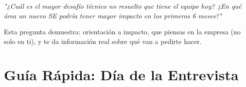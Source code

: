 \documentclass[11pt,a4paper]{article}
\begin{document}
\begin{tcolorbox}[colback=tipgreen!8,colframe=tipgreen]
\textit{"¿Cuál es el mayor desafío técnico no resuelto que tiene el equipo hoy?
¿En qué área un nuevo SE podría tener mayor impacto en los primeros 6 meses?"}

Esta pregunta demuestra: orientación a impacto, que piensas en la empresa (no solo en ti),
y te da información real sobre qué van a pedirte hacer.
\end{tcolorbox}

\newpage
\section{Guía Rápida: Día de la Entrevista}
\end{document}
